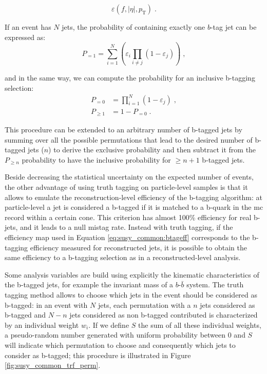 \begin{equation}
\varepsilon \left(f,|\eta|,p_{\mathrm{T}}\right) \; .
\label{eq:susy_common:btageff}
\end{equation}

\noindent If an event has $N$ jets, the probability of containing exactly one $b$-tag jet can be expressed as:
\begin{equation}
        P_{=1} = \sum\limits_{i=1}^N \left( \varepsilon_{i} \prod\limits_{i \neq j} \left( 1 - \varepsilon_{j} \right) \right) \; ,
\end{equation}

\noindent and in the same way, we can compute the probability for an inclusive b-tagging selection:
\begin{equation}
 \begin{split}
        P_{=0} &= \prod\limits_{i=1}^N \left( 1 - \varepsilon_{j} \right) \; ,\\
        P_{\geq 1} &= 1 - P_{=0} \; .
 \end{split}
\end{equation} 
 
\noindent This procedure can be extended to an arbitrary number of b-tagged jets by summing over all the possible permutations that lead to the desired number of b-tagged jets ($n$) to derive the exclusive probability and then subtract it from the $P_{\geq n}$ probability to have the inclusive probability for $\geq n+1$ b-tagged jets.
 
Beside decreasing the statistical uncertainty on the expected number of events, the other advantage of using truth tagging on particle-level samples is that it allows to emulate the reconstruction-level efficiency of the b-tagging algorithm: 
at particle-level a jet is considered a b-tagged if it is matched to a b-quark in the \gls{mc} record within a certain cone. This criterion has 
almost 100\% efficiency for real b-jets, and it leads to a null mistag rate. Instead with truth tagging, if the efficiency map used in Equation \ref{eq:susy_common:btageff} corresponds to the b-tagging efficiency measured for reconstructed jets, 
it is possible to obtain the same efficiency to a b-tagging selection as in a reconstructed-level analysis. 

Some analysis variables are build using explicitly the kinematic characteristics of the b-tagged jets, for example the invariant mass of a $b$-$\bar{b}$ system. The truth tagging method allows to choose which jets in the event should be considered as b-tagged: in an event with $N$ jets, each permutation with a $n$ jets considered as b-tagged and $N-n$ jets considered as non b-tagged contributed is characterized by an individual weight $w_i$. If we define $S$ the sum of all these individual weights, a pseudo-random number generated with uniform probability between 0 and $S$ will indicate which permutation to choose and consequently which jets to consider as b-tagged; this procedure is illustrated in Figure \ref{fig:susy_common_trf_perm}. 

